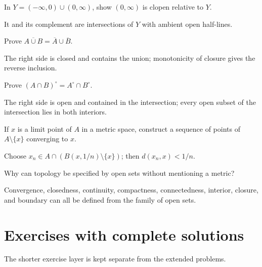\begin{problem}\label{prob:ii04-problem-08}
In $Y=(-\infty,0)\cup(0,\infty)$, show $(0,\infty)$ is clopen relative to $Y$.
\end{problem}
\begin{solution}
It and its complement are intersections of $Y$ with ambient open half-lines.
\end{solution}

\begin{problem}\label{prob:ii04-problem-09}
Prove $\overline{A\cup B}=\overline A\cup\overline B$.
\end{problem}
\begin{solution}
The right side is closed and contains the union; monotonicity of closure gives the reverse inclusion.
\end{solution}

\begin{problem}\label{prob:ii04-problem-10}
Prove $(A\cap B)^\circ=A^\circ\cap B^\circ$.
\end{problem}
\begin{solution}
The right side is open and contained in the intersection; every open subset of the intersection lies in both interiors.
\end{solution}

\begin{problem}\label{prob:ii04-problem-11}
If $x$ is a limit point of $A$ in a metric space, construct a sequence of points of $A\setminus\{x\}$ converging to $x$.
\end{problem}
\begin{solution}
Choose $x_n\in A\cap(B(x,1/n)\setminus\{x\})$; then $d(x_n,x)<1/n$.
\end{solution}

\begin{problem}\label{prob:ii04-problem-12}
Why can topology be specified by open sets without mentioning a metric?
\end{problem}
\begin{solution}
Convergence, closedness, continuity, compactness, connectedness, interior, closure, and boundary can all be defined from the family of open sets.
\end{solution}

\section{Exercises with complete solutions}
The shorter exercise layer is kept separate from the extended problems.

